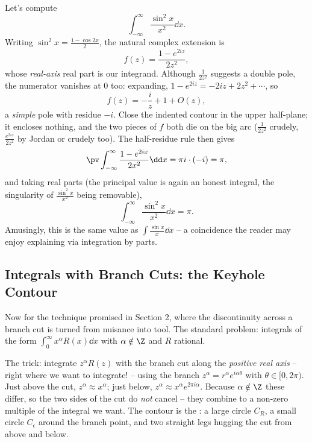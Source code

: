 \begin{example}
	Let's compute
	$$
	\int_{-\infty}^\infty \frac{\sin^2 x}{x^2} \dd x.
	$$
	Writing $\sin^2 x = \frac{1 - \cos 2x}{2}$, the natural complex extension is
	$$
	f(z) = \frac{1 - e^{2iz}}{2z^2},
	$$
	whose \emph{real-axis} real part is our integrand. Although $\frac{1}{2z^2}$ suggests a double pole, the numerator vanishes at $0$ too: expanding, $1 - e^{2iz} = -2iz + 2z^2 + \cdots$, so
	$$
	f(z) = -\frac iz + 1 + O(z),
	$$
	a \emph{simple} pole with residue $-i$. Close the indented contour in the upper half-plane; it encloses nothing, and the two pieces of $f$ both die on the big arc ($\frac{1}{2z^2}$ crudely, $\frac{e^{2iz}}{2z^2}$ by Jordan or crudely too). The half-residue rule then gives
	$$
	\pv \int_{-\infty}^\infty \frac{1 - e^{2ix}}{2x^2} \dd x = \pi i \cdot (-i) = \pi,
	$$
	and taking real parts (the principal value is again an honest integral, the singularity of $\frac{\sin^2 x}{x^2}$ being removable),
	$$
	\int_{-\infty}^\infty \frac{\sin^2 x}{x^2} \dd x = \pi.
	$$
	Amusingly, this is the same value as $\int \frac{\sin x}{x} \dd x$ -- a coincidence the reader may enjoy explaining via integration by parts.
\end{example}

\subsection{Integrals with Branch Cuts: the Keyhole Contour}

Now for the technique promised in Section 2, where the discontinuity across a branch cut is turned from nuisance into tool. The standard problem: integrals of the form $\int_0^\infty x^\alpha R(x) \dd x$ with $\alpha \notin \Z$ and $R$ rational.

The trick: integrate $z^\alpha R(z)$ with the branch cut along the \emph{positive real axis} -- right where we want to integrate! -- using the branch $z^\alpha = r^\alpha e^{i\alpha\theta}$ with $\theta \in [0, 2\pi)$. Just above the cut, $z^\alpha \approx x^\alpha$; just below, $z^\alpha \approx x^\alpha e^{2\pi i \alpha}$. Because $\alpha \notin \Z$ these differ, so the two sides of the cut do \emph{not} cancel -- they combine to a non-zero multiple of the integral we want. The contour is the : a large circle $C_R$, a small circle $C_\epsilon$ around the branch point, and two straight legs hugging the cut from above and below.

